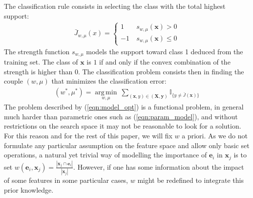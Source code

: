 \documentclass[preprint,12pt]{elsarticle}
\DeclareMathOperator*{\argmin}{arg\,min}
\theoremstyle{definition}
\begin{document}
The classification rule consists in selecting the class with the total highest support:
\begin{align} \tag{R1} \label{eqn:decision_rule}
 \bar J_{w, \mu}(x) =  \left\{\begin{matrix}
1 & ~s_{w, \mu}(\mathbf x) > 0\\ 
-1 & ~s_{w, \mu}(\mathbf x) \leq  0
\end{matrix}\right.
\end{align} The strength function $s_{w, \mu}$ models the support toward class 1 deduced from the training set. The class of $\mathbf x$ is $1$ if and only if the convex combination of the strength is higher than $0$. 
The classification problem consists then in finding the couple $(w, \mu)$ that minimizes the classification error:
\begin{align}
\label{eqn:model_opt}
(w^*, \mu^*) = \underset{w, \mu}{\argmin} ~ \sum_{ (\mathbf{x}, y) \in (\mathbf{X}, \mathbf{y})} \mathbb{I}_{\{y \neq \bar J(\mathbf{x})\}}
\end{align}
The problem described by (\ref{eqn:model_opt}) is a functional problem, in general much harder than parametric ones such as (\ref{eqn:param_model}), and without restrictions on the search space it may not be reasonable to look for a solution. For this reason and for the rest of this paper, we will fix $w$ a priori. As we do not formulate any particular assumption on the feature space and allow only basic set operations, a natural yet trivial way of modelling the importance of $\mathbf{e}_i$ in $\mathbf{x}_j$ is to set $w(\mathbf{e}_i, \mathbf{x}_j) = \frac{|\mathbf{x}_j \cap \mathbf{e}_i|}{|\mathbf{x}_j|}$. However, if one has some information about the impact of some features in some particular cases, $w$ might be redefined to integrate this prior knowledge.
\end{document}
